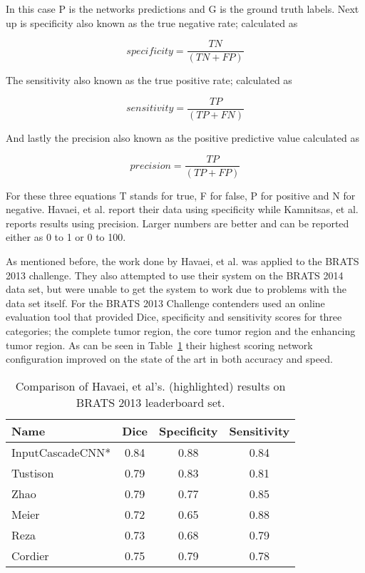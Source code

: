 \documentclass{sig-alternate}
\begin{document}
In this case P is the networks predictions and G is the ground truth labels. Next up is specificity also known as the true negative rate; calculated as

\begin{equation}
specificity = \frac{TN}{(TN+FP)}
\end{equation}

The sensitivity also known as the true positive rate; calculated as 

\begin{equation}
sensitivity = \frac{TP}{(TP+FN)}
\end{equation}

And lastly the precision also known as the positive predictive value calculated as

\begin{equation}
precision = \frac{TP}{(TP+FP)}
\end{equation}

For these three equations T stands for true, F for false, P for positive and N for negative. Havaei, et al. report their data using specificity while Kamnitsas, et al. reports results using precision. Larger numbers are better and can be reported either as 0 to 1 or 0 to 100.

As mentioned before, the work done by Havaei, et al. was applied to the BRATS 2013 challenge. They also attempted to use their system on the BRATS 2014 data set, but were unable to get the system to work due to problems with the data set itself. For the BRATS 2013 Challenge contenders used an online evaluation tool that provided Dice, specificity and sensitivity scores for three categories; the complete tumor region, the core tumor region and the enhancing tumor region. As can be seen in Table~\ref{table:Havaei} their highest scoring network configuration improved on the state of the art in both accuracy and speed.

\begin{table}
	\begin{tabular}{l | c | c | c }
		Name & Dice & Specificity & Sensitivity\\
		\hline
		\cellcolor{blue!25}InputCascadeCNN* & 0.84 & 0.88 & 0.84\\
		Tustison & 0.79 & 0.83 & 0.81\\
		Zhao & 0.79 & 0.77 & 0.85\\
		Meier & 0.72 & 0.65 & 0.88\\
		Reza & 0.73 & 0.68 & 0.79\\
		Cordier & 0.75 & 0.79 & 0.78
	\end{tabular}
	\caption{Comparison of Havaei, et al's. (highlighted) results on BRATS 2013 leaderboard set.}
	\label{table:Havaei}
\end{table}
\end{document}
